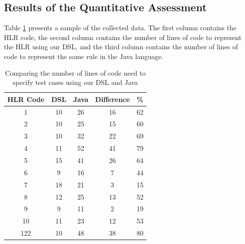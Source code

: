 \documentclass[twocolumn]{bmcart}%
\newcommand{\shc}{HLR\xspace}
\begin{document}
\subsection{Results of the Quantitative Assessment} 


 Table \ref{table:comparacao} presents a sample of the collected data. The first column contains the \shc code, the second column contains the number of lines of code to represent the \shc using our DSL, and the third column contains the number of lines of code to represent the same rule in the Java language.

\begin{table}[htb!]
	\centering
	\caption{Comparing the number of lines of code need to specify test cases using our DSL and Java}
	\label{table:comparacao}
	\begin{center}
		\begin{tabular}{ccccc}
			\toprule
			\textbf{\shc Code} & \textbf{DSL} & \textbf{Java} & \textbf{Difference} & \textbf{\%}   \\ \midrule
1                 & 10           & 26            & 16                 & 62                      \\ 
2                 & 10           & 25            & 15                 & 60                      \\ 
3                 & 10           & 32            & 22                 & 69                      \\ 
4                 & 11           & 52            & 41                 & 79                      \\ 
5                 & 15           & 41            & 26                 & 64                      \\ 
6                 & 9            & 16            & 7                  & 44                      \\ 
7                 & 18           & 21            & 3                  & 15                      \\ 
8                 & 12           & 25            & 13                 & 52                      \\ 
9                 & 9            & 11            & 2                  & 19                      \\ 
10                & 11           & 23            & 12                 & 53                      \\ 
122               & 10           & 48            & 38                 & 80                      \\ 

\end{tabular}
\end{center}
\end{table}
\end{document}
